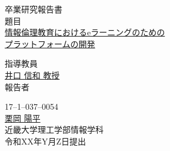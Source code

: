 
\begin{center}
\vspace*{1cm}
\large
{\LARGE 卒業研究報告書}\\
\vspace*{0.8cm}
題目\\
\vspace*{1cm}
{\Huge \underline{情報倫理教育におけるeラーニングのための}}\\
{\Huge \underline{プラットフォームの開発}}\\
\vspace{3mm}

\vspace*{3cm}
指導教員\\
\vspace*{0.3cm}
\underline{\LARGE 井口 信和 教授}\\
\vspace*{3cm}
報告者\\
\vspace*{0.3cm}

{17--1--037--0054}\\
\vspace*{0.3cm}
\underline{\Huge 栗岡 陽平}\\
\vspace*{0.5cm}
近畿大学理工学部情報学科\\
\vspace*{2cm}
令和XX年Y月Z日提出\\
\end{center}
 

